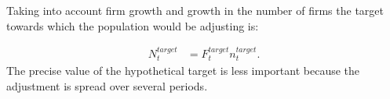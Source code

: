





Taking into account firm growth and growth in the number of firms the target towards which the population would be adjusting  is: 

 \begin{align}
N_t^{target}&=F_t^{target}n_t^{target}. 
\end{align} 
The precise value of the hypothetical target is less important because the adjustment is spread over several periods. %




